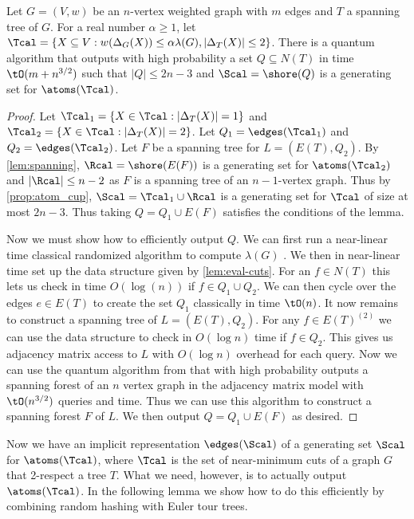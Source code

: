 \begin{lemma}
\label{lem:q_genset}
Let $G = (V,w)$ be an $n$-vertex weighted graph with $m$ edges and $T$ a spanning tree of $G$.  For a real number 
$\alpha \ge 1$, let $\Tcal = \{X \subseteq V: w(\Delta_G(X)) \le \alpha \lambda(G), |\Delta_T(X)| \le 2\}$.  
There is a quantum algorithm that outputs with high probability a set $Q \subseteq N(T)$ in time $\tO(m + n^{3/2})$ such that $|Q| \le 2n-3$ and $\Scal = \shore(Q)$
is a generating set for $\atoms(\Tcal)$.  
\end{lemma}

\begin{proof}
Let $\Tcal_1 = \{X \in \Tcal: |\Delta_T(X)| =1\}$ and $\Tcal_2 = \{X \in \Tcal: |\Delta_T(X)| =2\}$. Let $Q_1 = \edges(\Tcal_1)$ and $Q_2 = \edges(\Tcal_2)$.  
Let $F$ be a spanning tree for $L = (E(T), Q_2)$.  By \cref{lem:spanning}, $\Rcal = \shore(E(F))$ is a generating set for 
$\atoms(\Tcal_2)$ and $|\Rcal| \le n-2$ as $F$ is a spanning tree of an $n-1$-vertex graph.  Thus by \cref{prop:atom_cup}, $\Scal = \Tcal_1 \cup \Rcal$ is a generating set for $\Tcal$ of size at most $2n-3$.  
Thus taking $Q = Q_1 \cup E(F)$ satisfies the conditions of the lemma.

Now we must show how to efficiently output $Q$.  We can first run a near-linear time classical randomized algorithm to compute $\lambda(G)$ \cite{Karger00}.  We then in near-linear time set up the 
data structure given by \cref{lem:eval-cuts}.  For an $f \in N(T)$ this lets us check in time $O(\log(n))$ if $f \in Q_1 \cup Q_2$.  We can then cycle over the edges $e\in E(T)$ to create the set $Q_1$ classically in time 
$\tO(n)$.  It now remains to construct a spanning tree of $L = (E(T), Q_2)$.
For any $f \in E(T)^{(2)}$ we can use the data structure to check in $O(\log n)$ time if $f \in Q_2$.
This gives us adjacency matrix access to $L$ with $O(\log n)$ overhead for each query.  
Now we can use the quantum algorithm from \cite{DHHM06} that with high probability outputs a spanning forest of an $n$ vertex graph in the adjacency matrix model with $\tO(n^{3/2})$  queries and time.  
Thus we can use this algorithm to construct a spanning forest $F$ of $L$.  We then output $Q = Q_1 \cup E(F)$ as desired.
\end{proof}

Now we have an implicit representation $\edges(\Scal)$ of a generating set $\Scal$ for $\atoms(\Tcal)$, where $\Tcal$ is the set of near-minimum cuts of a graph $G$ that 2-respect a tree $T$.  
What we need, however, is to actually output $\atoms(\Tcal)$.
In the following lemma we show how to do this efficiently by combining random hashing with Euler tour trees.

